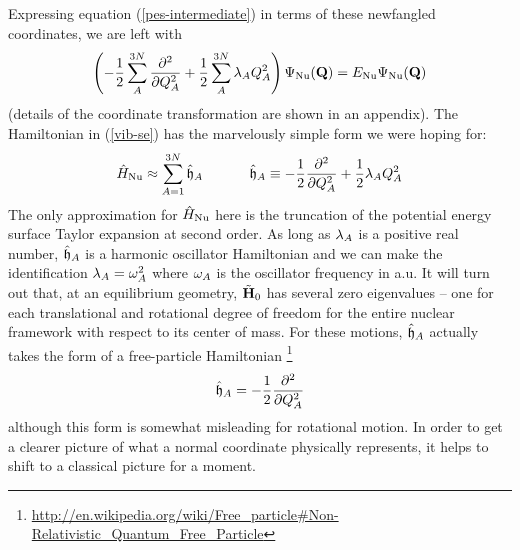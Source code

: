 \documentclass[11pt]{article}
\begin{document}
Expressing equation (\ref{pes-intermediate}) in terms of these newfangled
coordinates, we are left with 
\begin{align}
\label{vib-se}
\left(
-\dfrac{1}{2}\sum_A^{3N}
     \dfrac{ \partial^{2}  }{\partial Q_A ^{2}}
+\dfrac{1}{2}\sum_A^{3N}
    \lambda_A Q_A^2
\right)
    \Psi_{\mathrm{Nu}}(\mathbf{Q})
=
    E_{\mathrm{Nu}}
    \Psi_{\mathrm{Nu}}(\mathbf{Q})
\end{align}
(details of the coordinate transformation are shown in an appendix). The
Hamiltonian in (\ref{vib-se}) has the marvelously simple form we were hoping
for:
\begin{align}
\label{harm-hamiltonian}
    \hat{H}_{\mathrm{Nu}}
\approx
    \sum_{A=1}^{3N}
    \hat{\mathfrak{h}}_A
\ \ \ \ \ \ \ \ \ \ 
    \hat{\mathfrak{h}}_A
\equiv
-\dfrac{1}{2}
     \dfrac{ \partial^{2}  }{\partial Q_A ^{2}}
+\dfrac{1}{2}
    \lambda_A Q_A^2
\end{align}
The only approximation for $\hat{H}_{\mathrm{Nu}}$ here is the truncation of the potential
energy surface Taylor expansion at second order. As long as $\lambda_A$ is a
positive real number, $\hat{\mathfrak{h}}_A$ is a harmonic oscillator Hamiltonian and
we can make the identification $\lambda_A=\omega_A^2$ where $\omega_A$ is the oscillator
frequency in a.u. It will turn out that, at an equilibrium geometry,
$\tilde{\mathbf{H}}_0$ has several zero eigenvalues -- one for each translational and
rotational degree of freedom for the entire nuclear framework with respect to
its center of mass. For these motions, $\hat{\mathfrak{h}}_A$ actually takes the form
of a free-particle Hamiltonian
\footnote{\url{http://en.wikipedia.org/wiki/Free_particle\#Non-Relativistic_Quantum_Free_Particle}}
\begin{align}
    \hat{\mathfrak{h}}_A
    = -\dfrac{1}{2}  \dfrac{ \partial^{2}  }{\partial Q_A ^{2}}
\end{align}
although this form is somewhat misleading for rotational motion. In order to
get a clearer picture of what a normal coordinate physically represents, it
helps to shift to a classical picture for a moment.
\end{document}
